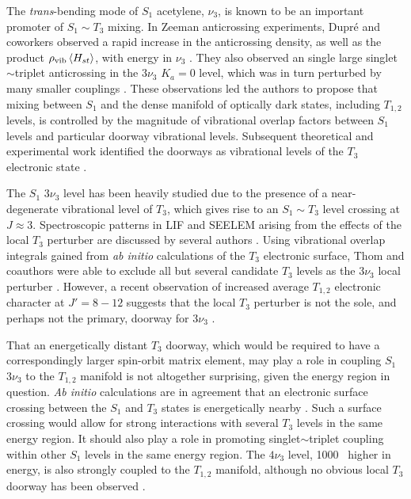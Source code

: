 \documentclass[12pt]{mitthesis}
\begin{document}
The \emph{trans}-bending mode of $S_1$ acetylene, $\nu_3$, is known to
be an important promoter of $S_1 \sim T_3$ mixing.  In Zeeman
anticrossing experiments, Dupr\'{e} and coworkers observed a rapid
increase in the anticrossing density, as well as the product
$\rho_{\text{vib}} \mathinner{\langle{H_{st}}\rangle}$, with energy in $\nu_3$
\cite{dupre91, dupre95b}.  They also observed an single large
singlet$\sim$triplet anticrossing in the $3 \nu_3$ $K_a=0$ level,
which was in turn perturbed by many smaller couplings \cite{dupre93}.
These observations led the authors to propose that mixing between
$S_1$ and the dense manifold of optically dark states, including
$T_{1,2}$ levels, is controlled by the magnitude of vibrational
overlap factors between $S_1$ levels and particular doorway
vibrational levels.  Subsequent theoretical and experimental work
identified the doorways as vibrational levels of the $T_3$ electronic
state \cite{vacek96, sherrill96, humphrey97, altunata00}.

The $S_1$ $3 \nu_3$  level has been heavily studied due to the
presence of a near-degenerate vibrational level of $T_3$, which gives
rise to an $S_1 \sim T_3$ level crossing at $J \approx 3$.
Spectroscopic patterns in LIF and SEELEM arising from the effects of
the local $T_3$ perturber are discussed by several authors
\cite{humphrey97, altunata00, altunata01, mishra04}.  Using
vibrational overlap integrals gained from \emph{ab initio}
calculations of the $T_3$ electronic surface, Thom and coauthors were
able to exclude all but several candidate $T_3$ levels as the $3\nu_3$
local perturber \cite{thom07}.
However, a recent observation of increased average $T_{1,2}$
electronic character at $J'=8-12$ suggests that the local $T_3$
perturber is not the sole, and perhaps not the primary, doorway for $3
\nu_3$  \cite{degroot07}.

That an energetically distant $T_3$ doorway, which would be required
to have a correspondingly larger spin-orbit matrix element, may play a
role in coupling $S_1$ $3 \nu_3$ to the $T_{1,2}$ manifold is not
altogether surprising, given the energy region in question.  \emph{Ab
  initio} calculations are in agreement that an electronic surface
crossing between the $S_1$ and $T_3$ states is energetically nearby
\cite{ventura03, thom07}.  Such a surface crossing would allow for
strong interactions with several $T_3$ levels in the same energy
region.  It should also play a role in promoting singlet$\sim$triplet
coupling within other $S_1$ levels in the same energy region.  The
$4\nu_3$ level, 1000 \rcm\ higher in energy, is also strongly coupled
to the $T_{1,2}$ manifold, although no obvious local $T_3$ doorway has
been observed \cite{drabbels94, ochi91}.  
\end{document}
